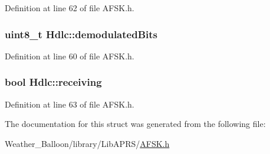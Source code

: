Definition at line 62 of file A\+F\+S\+K.\+h.

\subsubsection[{\texorpdfstring{demodulated\+Bits}{demodulatedBits}}]{\setlength{\rightskip}{0pt plus 5cm}uint8\+\_\+t Hdlc\+::demodulated\+Bits}\hypertarget{struct_hdlc_a1be563f695b6ea1097624b75e81b89b8}{}\label{struct_hdlc_a1be563f695b6ea1097624b75e81b89b8}


Definition at line 60 of file A\+F\+S\+K.\+h.

\subsubsection[{\texorpdfstring{receiving}{receiving}}]{\setlength{\rightskip}{0pt plus 5cm}bool Hdlc\+::receiving}\hypertarget{struct_hdlc_ad7bc494d6beca6c71123a96cee2baeb7}{}\label{struct_hdlc_ad7bc494d6beca6c71123a96cee2baeb7}


Definition at line 63 of file A\+F\+S\+K.\+h.



The documentation for this struct was generated from the following file\+:\begin{DoxyCompactItemize}
\item 
Weather\+\_\+\+Balloon/library/\+Lib\+A\+P\+R\+S/\hyperlink{_a_f_s_k_8h}{A\+F\+S\+K.\+h}\end{DoxyCompactItemize}
